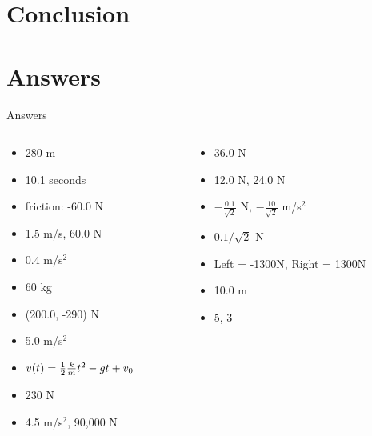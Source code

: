 \documentclass{beamer}
\begin{document}
\section{Conclusion}

\section{Answers}

\begin{frame}{Answers}
\begin{columns}[T]
\begin{column}{0.5\textwidth}
\begin{itemize}
\item 280 m
\item 10.1 seconds
\item friction: -60.0 N
\item 1.5 m/s, 60.0 N
\item 0.4 m/s$^2$
\item 60 kg
\item (200.0, -290) N
\item 5.0 m/s$^2$
\item $v(t) = \frac{1}{2} \frac{k}{m} t^2 - gt +v_{\rm 0}$
\item 230 N
\item 4.5 m/s$^2$, 90,000 N
\end{itemize}
\end{column}
\begin{column}{0.5\textwidth}
\begin{itemize}
\item 36.0 N
\item 12.0 N, 24.0 N
\item $-\frac{0.1}{\sqrt{2}}$ N, $-\frac{10}{\sqrt{2}}$ m/s$^2$
\item $0.1/\sqrt{2}$ N
\item Left = -1300N, Right = 1300N
\item 10.0 m
\item 5, 3
\end{itemize}
\end{column}
\end{columns}
\end{frame}
\end{document}
